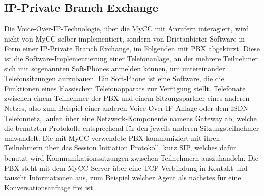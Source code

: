 \subsection{IP-Private Branch Exchange}
\label{subsec:IP-Private Branch Exchange}
Die Voice-Over-IP-Technologie, über die MyCC mit Anrufern interagiert, wird nicht von MyCC selber implementiert, sondern von Drittanbieter-Software in Form einer IP-Private Branch Exchange, im Folgenden mit PBX abgekürzt. Diese ist die Software-Implementierung einer Telefonanlage, an der mehrere Teilnehmer sich mit sogenannten Soft-Phones anmelden können, um untereinander Telefonsitzungen aufzubauen. Ein Soft-Phone ist eine Software, die die Funktionen eines klassischen Telefonapparats zur Verfügung stellt. Telefonate zwischen einem Teilnehmer der PBX und einem Sitzungspartner eines anderen Netzes, also zum Beispiel einer anderen Voice-Over-IP-Anlage oder dem ISDN-Telefonnetz, laufen über eine Netzwerk-Komponente namens Gateway ab, welche die benutzten Protokolle entsprechend für den jeweils anderen Sitzungsteilnehmer umwandelt. Die mit MyCC verwendete PBX kommuniziert mit ihren Teilnehmern über das Session Initiation Protokoll, kurz SIP, welches dafür benutzt wird Kommunikationssitzungen zwischen Teilnehmern auszuhandeln. Die PBX steht mit dem MyCC-Server über eine TCP-Verbindung in Kontakt und tauscht Informationen aus, zum Beispiel welcher Agent als nächstes für eine Konversationsanfrage frei ist. 

